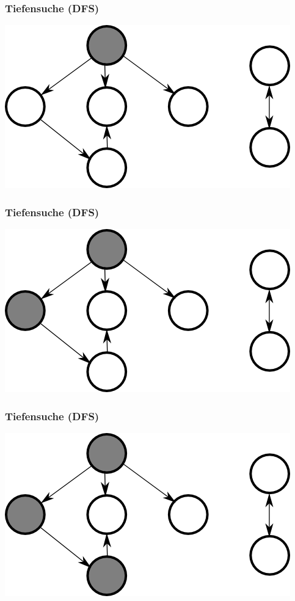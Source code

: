 \documentclass{beamer}
\begin{document}
\begin{frame}
\frametitle{Tiefensuche (DFS)}
\begin{center}
\includegraphics{dfs1}
\end{center}
\end{frame}


\begin{frame}
\frametitle{Tiefensuche (DFS)}
\begin{center}
\includegraphics{dfs2}
\end{center}
\end{frame}


\begin{frame}
\frametitle{Tiefensuche (DFS)}
\begin{center}
\includegraphics{dfs3}
\end{center}
\end{frame}
\end{document}
